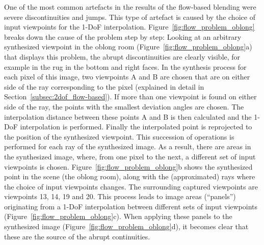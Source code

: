 One of the most common artefacts in the results of the flow-based blending were severe discontinuities and jumps. This type of artefact is caused by the choice of input viewpoints for the 1-DoF interpolation. Figure~\ref{fig:flow_problem_oblong} breaks down the cause of the problem step by step: Looking at an arbitrary synthesized viewpoint in the oblong room (Figure~\ref{fig:flow_problem_oblong}a) that displays this problem, the abrupt discontinuities are clearly visible, for example in the rug in the bottom and right faces. 
In the synthesis process for each pixel of this image, two viewpoints A and B are chosen that are on either side of the ray corresponding to the pixel (explained in detail in Section~\ref{subsec:2dof_flow-based}). If more than one viewpoint is found on either side of the ray, the points with the smallest deviation angles are chosen. The interpolation distance between these points A and B is then calculated and the 1-DoF interpolation is performed. Finally the interpolated point is reprojected to the position of the synthesized viewpoint.
This succession of operations is performed for each ray of the synthesized image. As a result, there are areas in the synthesized image, where, from one pixel to the next, a different set of input viewpoints is chosen.
Figure~\ref{fig:flow_problem_oblong}b shows the synthesized point in the scene (the oblong room), along with the (approximated) rays where the choice of input viewpoints changes. The surrounding captured viewpoints are viewpoints 13, 14, 19 and 20.
This process leads to image areas (``panels'') originating from a 1-DoF interpolation between different sets of input viewpoints (Figure~\ref{fig:flow_problem_oblong}c). When applying these panels to the synthesized image (Figure~\ref{fig:flow_problem_oblong}d), it becomes clear that these are the source of the abrupt continuities.

